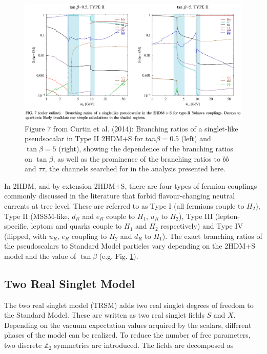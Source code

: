 \documentclass{article}
\begin{document}
\begin{figure}[ht]
    \centering
    \includegraphics[width=15cm]{figures/curtin-2014-figure-7-BRs-of-singlelike-pseudoscalar-type-II.png}
    \caption{Figure 7 from Curtin et al. (2014): Branching ratios of a singlet-like pseudsocalar in Type II 2HDM+S for $tan\beta = 0.5$ (left) and $\tan\beta = 5$ (right), showing the dependence of the branching ratios on $\tan\beta$, as well as the prominence of the branching ratios to $bb$ and $\tau\tau$, the channels searched for in the analysis presented here.}
    \label{fig:curtin-2014-fig-4-typeI-BRs}
\end{figure}


In 2HDM, and by extension 2HDM+S, there are four types of fermion couplings commonly discussed in the literature that forbid flavour-changing neutral currents at tree level. These are referred to as Type I (all fermions couple to $H_2$), Type II (MSSM-like, $d_R$ and $e_R$ couple to $H_1$, $u_R$ to $H_2$), Type III (lepton-specific, leptons and quarks couple to $H_1$ and $H_2$ respectively) and Type IV (flipped, with $u_R$, $e_R$ coupling to $H_2$ and $d_R$ to $H_1$). The exact branching ratios of the pseudoscalars to Standard Model particles vary depending on the 2HDM+S model and the value of $\tan\beta$ (e.g. Fig. \ref{fig:curtin-2014-fig-4-typeI-BRs}).

\subsection{Two Real Singlet Model}
The two real singlet model (TRSM) adds two real singlet degrees of freedom to the Standard Model. These are written as two real singlet fields $S$ and $X$. Depending on the vacuum expectation values acquired by the scalars, different phases of the model can be realized. To reduce the number of free parameters, two discrete $\mathbb{Z}_2$ symmetries are introduced. The fields are decomposed as
\end{document}
